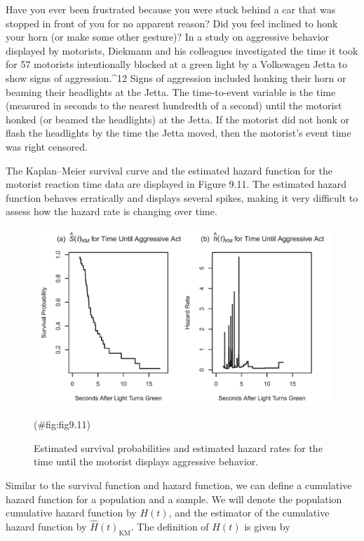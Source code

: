 \documentclass[
]{report}
\begin{document}
Have you ever been frustrated because you were stuck behind a car that was stopped in front of you for no apparent reason? Did you feel inclined to honk your horn (or make some other gesture)? In a study on aggressive behavior displayed by motorists, Diekmann and his colleagues investigated the time it took for 57 motorists intentionally blocked at a green light by a Volkswagen Jetta to show signs of aggression.\^{}12 Signs of aggression included honking their horn or beaming their headlights at the Jetta. The time-to-event variable is the time (measured in seconds to the nearest hundredth of a second) until the motorist honked (or beamed the headlights) at the Jetta. If the motorist did not honk or flash the headlights by the time the Jetta moved, then the motorist's event time was right censored.

The Kaplan--Meier survival curve and the estimated hazard function for the motorist reaction time data are displayed in Figure 9.11. The estimated hazard function behaves erratically and displays several spikes, making it very difficult to assess how the hazard rate is changing over time.

\begin{figure}

{\centering \includegraphics[width=1\linewidth]{docs/Fig9_11} 

}

\caption{Estimated survival probabilities and estimated hazard rates for the time until the motorist displays aggressive behavior.}(\#fig:fig9.11)
\end{figure}

Similar to the survival function and hazard function, we can define a cumulative hazard function for a population and a sample. We will denote the population cumulative hazard function by \(H(t)\), and the estimator of the cumulative hazard function by \(\widehat H(t)_{\mathrm{KM}}\). The definition of \(H(t)\) is given by
\end{document}
